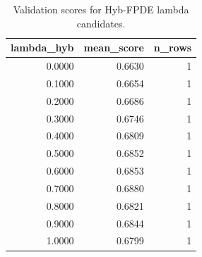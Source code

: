 \begin{table}[t]
\caption{Validation scores for Hyb-FPDE lambda candidates.}
\label{tab:lambda_distribution_computed}
\centering
\begin{tabular}{rrr}
\toprule
lambda\_hyb & mean\_score & n\_rows \\
\midrule
0.0000 & 0.6630 & 1 \\
0.1000 & 0.6654 & 1 \\
0.2000 & 0.6686 & 1 \\
0.3000 & 0.6746 & 1 \\
0.4000 & 0.6809 & 1 \\
0.5000 & 0.6852 & 1 \\
0.6000 & 0.6853 & 1 \\
0.7000 & 0.6880 & 1 \\
0.8000 & 0.6821 & 1 \\
0.9000 & 0.6844 & 1 \\
1.0000 & 0.6799 & 1 \\
\bottomrule
\end{tabular}

\end{table}
